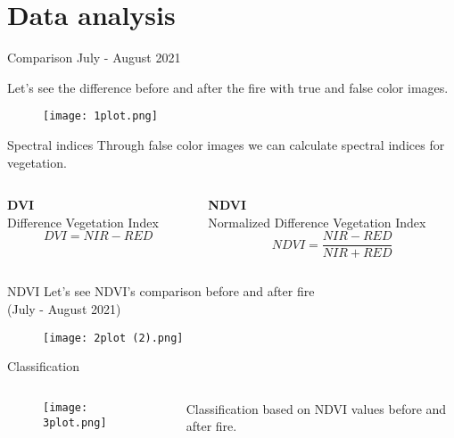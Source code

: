 \documentclass{beamer}
\begin{document}
\section{Data analysis} %

\begin{frame}{Comparison July - August 2021}

\centering
Let's see the difference before and after the fire with true and false color images. 
\begin{figure}
    \centering
    \texttt{[image: 1plot.png]}
\end{figure}
\end{frame}

\begin{frame}{Spectral indices}
\centering %
Through false color images we can calculate spectral indices for vegetation.
\bigskip %
\bigskip
\begin{columns}
    \begin{column}[t]{0.55\textwidth}
    \centering
    \textbf{DVI}\\ \small Difference Vegetation Index
    \begin{equation*}
        DVI = NIR - RED
    \end{equation*}
    \end{column}

    \begin{column}[t]{0.6\textwidth}
    \centering
    \textbf{NDVI}\\ \small Normalized Difference Vegetation Index
    \begin{equation*}
        NDVI = \frac{NIR - RED}{NIR + RED}
    \end{equation*}
    \end{column}   
\end{columns}    
\end{frame}

\begin{frame}{NDVI}
\centering
Let's see NDVI's comparison before and after fire\\
(July - August 2021)
\begin{figure}
    \centering
    \texttt{[image: 2plot (2).png]}
\end{figure}   
\end{frame}

\begin{frame}{Classification}
\begin{columns}
    \begin{column}{0.65\textwidth}
    \begin{figure}
           \centering
           \texttt{[image: 3plot.png]}
       \end{figure}   
    \end{column}

    \begin{column}{0.5\textwidth}
       Classification based on NDVI values before and after fire. 
    \end{column}
\end{columns}    
\end{frame}
\end{document}
